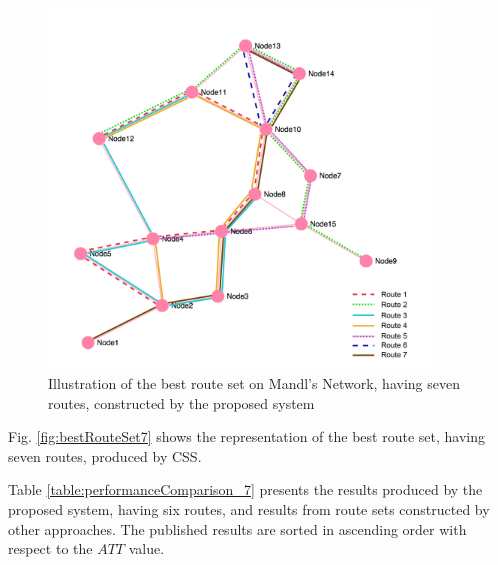 \begin{figure}[H]
    \begin{center}
    \includegraphics[width=4in]{assets/mandlnetwork_7routes.png}
    \end{center}
    \caption{Illustration of the best route set on Mandl's Network, having seven routes, constructed by the proposed system}
    \label{fig:bestRouteSet7} 
\end{figure}

Fig. \vref{fig:bestRouteSet7} shows the representation of the best route set, having seven routes, produced by CSS.

Table \vref{table:performanceComparison_7} presents the results produced by the proposed system, having six routes, and results from route sets constructed by other approaches. The published results are sorted in ascending order with respect to the $ATT$ value.

